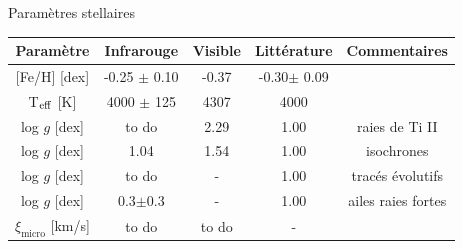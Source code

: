\documentclass[10pt]{beamer}
\begin{document}
\begin{frame}[fragile]{Paramètres stellaires}
\begin{table}[h!]
    \begin{center}
        \renewcommand{\arraystretch}{1.5}
        \begin{tabular}{c|ccc|c}
            Paramètre & Infrarouge &Visible& Littérature &Commentaires\\
            \hline
            $[$Fe/H$]$ [dex]& -0.25 $\pm$ 0.10 & -0.37 &-0.30$\pm$ 0.09&\\
            T$_{\rm eff}$ [K] & 4000 $\pm$ 125 &4307 & 4000& \\

            log $g$ [dex]& to do & 2.29 & 1.00&raies de Ti II\\
            log $g$ [dex] & 1.04 & 1.54 & 1.00 &isochrones\\
            log $g$ [dex] & to do & - & 1.00 &tracés évolutifs\\
            log $g$ [dex] & 0.3$\pm$0.3 &-& 1.00 &ailes raies fortes\\
            $\xi_{\text{micro}}$ [km/s]& to do & to do & - &\\
        \end{tabular}
    \end{center}
\end{table}
\end{frame}
\end{document}
